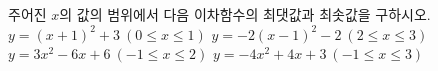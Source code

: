 주어진 $x$의 값의 범위에서 다음 이차함수의 최댓값과 최솟값을 구하시오.
 $y=(x+1)^2+3 \ (0\le x\le 1)$
 $y=-2(x-1)^2-2 \ (2\le x\le 3)$
 $y=3x^2-6x+6 \ (-1\le x\le 2)$
 $y=-4x^2+4x+3 \ (-1\le x\le 3)$
